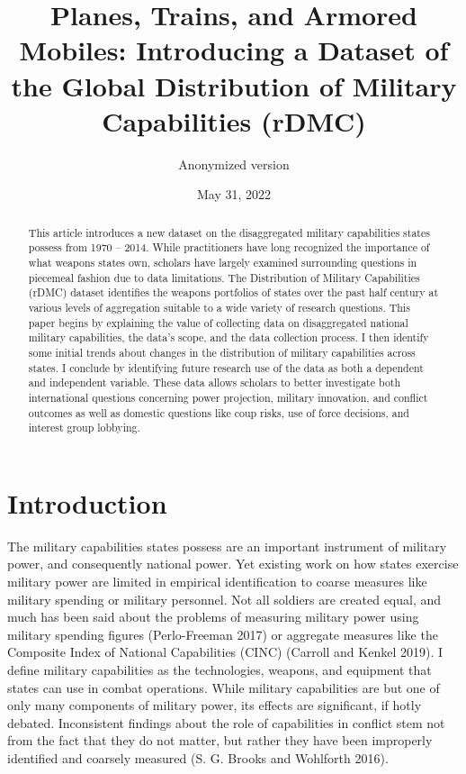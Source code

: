 \documentclass[
]{article}
\title{\singlespacing Planes, Trains, and Armored Mobiles: Introducing a Dataset of the Global Distribution of Military Capabilities (rDMC)}
\author{Anonymized version}
\date{May 31, 2022}
\begin{document}
\maketitle
\begin{abstract}
\singlespacing \noindent This article introduces a new dataset on the disaggregated military capabilities states possess from 1970 -- 2014. While practitioners have long recognized the importance of what weapons states own, scholars have largely examined surrounding questions in piecemeal fashion due to data limitations. The Distribution of Military Capabilities (rDMC) dataset identifies the weapons portfolios of states over the past half century at various levels of aggregation suitable to a wide variety of research questions. This paper begins by explaining the value of collecting data on disaggregated national military capabilities, the data's scope, and the data collection process. I then identify some initial trends about changes in the distribution of military capabilities across states. I conclude by identifying future research use of the data as both a dependent and independent variable. These data allows scholars to better investigate both international questions concerning power projection, military innovation, and conflict outcomes as well as domestic questions like coup risks, use of force decisions, and interest group lobbying.
\end{abstract}

\newpage

\hypertarget{introduction}{%
\section{Introduction}\label{introduction}}

The military capabilities states possess are an important instrument of military power, and consequently national power. Yet existing work on how states exercise military power are limited in empirical identification to coarse measures like military spending or military personnel. Not all soldiers are created equal, and much has been said about the problems of measuring military power using military spending figures (Perlo-Freeman 2017) or aggregate measures like the Composite Index of National Capabilities (CINC) (Carroll and Kenkel 2019). I define military capabilities as the technologies, weapons, and equipment that states can use in combat operations. While military capabilities are but one of only many components of military power, its effects are significant, if hotly debated. Inconsistent findings about the role of capabilities in conflict stem not from the fact that they do not matter, but rather they have been improperly identified and coarsely measured (S. G. Brooks and Wohlforth 2016).
\end{document}
